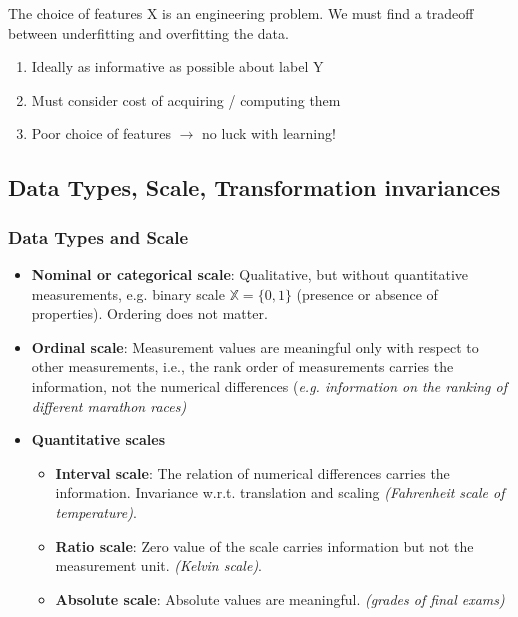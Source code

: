\documentclass[MachineLearning]{subfiles}
\begin{document}
The choice of features X is an engineering problem. We must find a tradeoff between underfitting and overfitting the data.
\begin{enumerate}
\item Ideally as informative as possible about label Y
\item Must consider cost of acquiring / computing them
\item Poor choice of features \(\rightarrow\) no luck with learning!
\end{enumerate}
\subsection{Data Types, Scale, Transformation invariances}
\subsubsection{Data Types and Scale}
\begin{itemize}
\item \textbf{Nominal or categorical scale}: Qualitative, but without quantitative measurements, e.g. binary scale \(\mathbb{X} = \{0, 1\}\) (presence or absence of
properties). Ordering does not matter.
\item \textbf{Ordinal scale}: Measurement values are meaningful only with respect to other measurements, i.e., the rank order of measurements carries
the information, not the numerical differences {\color{orange}(\emph{e.g. information on the ranking of different marathon races)}}
\item \textbf{Quantitative scales}
\begin{itemize}
\item \textbf{Interval scale}: The relation of numerical differences carries
the information. Invariance w.r.t. translation and scaling {\color{orange}\emph{(Fahrenheit scale of temperature)}}.
\item \textbf{Ratio scale}: Zero value of the scale carries information but
not the measurement unit. {\color{orange}\emph{(Kelvin scale)}}.
\item \textbf{Absolute scale}: Absolute values are meaningful. {\color{orange}\emph{(grades of final exams)}}
\end{itemize}
\end{itemize}
\end{document}
